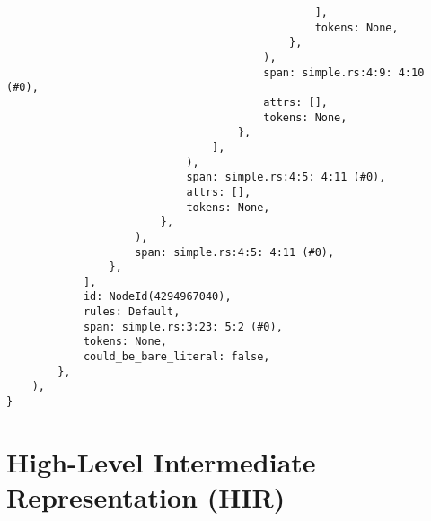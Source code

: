 \documentclass[
  11pt,
  twoside,symmetric]{report}
\begin{document}
\begin{verbatim}
                                                ],
                                                tokens: None,
                                            },
                                        ),
                                        span: simple.rs:4:9: 4:10 (#0),
                                        attrs: [],
                                        tokens: None,
                                    },
                                ],
                            ),
                            span: simple.rs:4:5: 4:11 (#0),
                            attrs: [],
                            tokens: None,
                        },
                    ),
                    span: simple.rs:4:5: 4:11 (#0),
                },
            ],
            id: NodeId(4294967040),
            rules: Default,
            span: simple.rs:3:23: 5:2 (#0),
            tokens: None,
            could_be_bare_literal: false,
        },
    ),
}
\end{verbatim}

\normalsize

\hypertarget{high-level-intermediate-representation-hir}{%
\section{High-Level Intermediate Representation
(HIR)}\label{high-level-intermediate-representation-hir}}

\small
\end{document}
